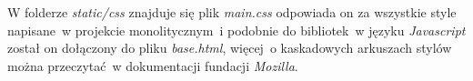 W folderze \textit{static/css} znajduje się plik \textit{main.css} odpowiada on za wszystkie style napisane~w projekcie monolitycznym~i podobnie do bibliotek~w języku \textit{Javascript} został on dołączony do pliku \textit{base.html}, więcej~o kaskadowych arkuszach stylów można przeczytać~w dokumentacji fundacji \textit{Mozilla}\cite{mdn}.
